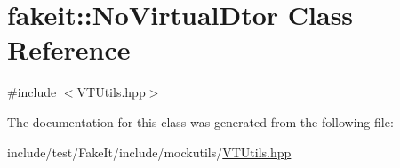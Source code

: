 \hypertarget{classfakeit_1_1NoVirtualDtor}{}\section{fakeit\+::No\+Virtual\+Dtor Class Reference}
\label{classfakeit_1_1NoVirtualDtor}


{\ttfamily \#include $<$V\+T\+Utils.\+hpp$>$}



The documentation for this class was generated from the following file\+:\begin{DoxyCompactItemize}
\item 
include/test/\+Fake\+It/include/mockutils/\mbox{\hyperlink{VTUtils_8hpp}{V\+T\+Utils.\+hpp}}\end{DoxyCompactItemize}
